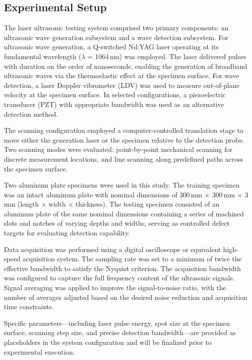\subsection{Experimental Setup}
\label{sec:experiment-setup}

The laser ultrasonic testing system comprised two primary components: an ultrasonic wave generation subsystem and a wave detection subsystem. For ultrasonic wave generation, a Q-switched Nd:YAG laser operating at its fundamental wavelength ($\lambda$ = 1064\,nm) was employed. The laser delivered pulses with duration on the order of nanoseconds, enabling the generation of broadband ultrasonic waves via the thermoelastic effect at the specimen surface. For wave detection, a laser Doppler vibrometer (LDV) was used to measure out-of-plane velocity at the specimen surface. In selected configurations, a piezoelectric transducer (PZT) with appropriate bandwidth was used as an alternative detection method.

The scanning configuration employed a computer-controlled translation stage to move either the generation laser or the specimen relative to the detection probe. Two scanning modes were evaluated: point-by-point mechanical scanning for discrete measurement locations, and line scanning along predefined paths across the specimen surface.

Two aluminum plate specimens were used in this study. The training specimen was an intact aluminum plate with nominal dimensions of 300\,mm $\times$ 300\,mm $\times$ 3\,mm (length $\times$ width $\times$ thickness). The testing specimen consisted of an aluminum plate of the same nominal dimensions containing a series of machined slots and notches of varying depths and widths, serving as controlled defect targets for evaluating detection capability.

Data acquisition was performed using a digital oscilloscope or equivalent high-speed acquisition system. The sampling rate was set to a minimum of twice the effective bandwidth to satisfy the Nyquist criterion. The acquisition bandwidth was configured to capture the full frequency content of the ultrasonic signals. Signal averaging was applied to improve the signal-to-noise ratio, with the number of averages adjusted based on the desired noise reduction and acquisition time constraints.

Specific parameters—including laser pulse energy, spot size at the specimen surface, scanning step size, and precise detection bandwidth—are provided as placeholders in the system configuration and will be finalized prior to experimental execution.

